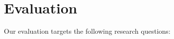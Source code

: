 % 




\section{Evaluation}\label{sec:eval}
Our evaluation targets the following research questions:

